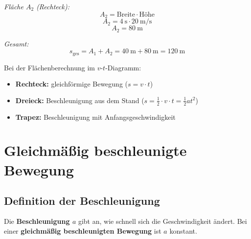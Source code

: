 \documentclass[11pt, a4paper]{article}
\newcommand{\wichtig}[1]{\textcolor{physik}{\textbf{#1}}}
\begin{document}
\begin{beispielbox}[title=Beispiel: Weg aus $v$-$t$-Diagramm berechnen]
\begin{minipage}[t]{0.48\textwidth}
\textit{Fläche $A_2$ (Rechteck):}
$$A_2 = \text{Breite} \cdot \text{Höhe}$$
$$A_2 = \SI{4}{\second} \cdot \SI{20}{\metre\per\second}$$
$$A_2 = \SI{80}{\metre}$$

\textit{Gesamt:}
$$s_{\text{ges}} = A_1 + A_2 = \SI{40}{\metre} + \SI{80}{\metre} = \SI{120}{\metre}$$
\end{minipage}

\vspace{0.5em}

\begin{center}
\end{center}
\end{beispielbox}

\begin{warnbox}
Bei der Flächenberechnung im $v$-$t$-Diagramm:
\begin{itemize}[leftmargin=1em]
    \item \textbf{Rechteck:} gleichförmige Bewegung ($s = v \cdot t$)
    \item \textbf{Dreieck:} Beschleunigung aus dem Stand ($s = \frac{1}{2} \cdot v \cdot t = \frac{1}{2} a t^2$)
    \item \textbf{Trapez:} Beschleunigung mit Anfangsgeschwindigkeit
\end{itemize}
\end{warnbox}

\newpage


\section{Gleichmäßig beschleunigte Bewegung}

\subsection{Definition der Beschleunigung}

\begin{merksatz}
Die \wichtig{Beschleunigung $a$} gibt an, wie schnell sich die Geschwindigkeit ändert. Bei einer \wichtig{gleichmäßig beschleunigten Bewegung} ist $a$ konstant.
\end{merksatz}
\end{document}
